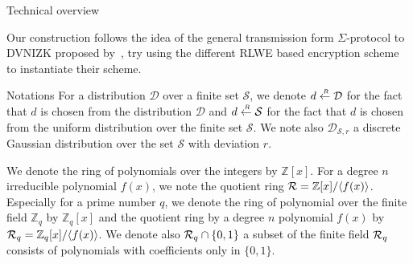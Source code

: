 \begin{subsection}{Technical overview}

  Our construction follows the idea of the general transmission form $\Sigma$-protocol to DVNIZK proposed by~\cite{DBLP:conf/pkc/ChaidosG15},
  try using the different RLWE based encryption scheme to instantiate their scheme.
  
\end{subsection}




\begin{subsection}{Notations}
  For a distribution $\mathcal{D}$ over a finite set $\mathcal{S}$,
  we denote $d \stackrel{{\scriptscriptstyle \mkern4mu R}}{\gets} \mathcal{D}$ for the fact that $d$ is chosen from the distribution $\mathcal{D}$ and
  $d \stackrel{{\scriptscriptstyle \mkern4mu R}}{\gets} \mathcal{S}$ for the fact that $d$ is chosen from the uniform distribution over the finite set $\mathcal{S}$.
  We note also $\mathcal{D}_{\mathcal{S}, r}$ a discrete Gaussian distribution over the set $\mathcal{S}$ with deviation $r$.

  We denote the ring of polynomials over the integers by $\mathbb{Z}[x]$.
  For a degree $n$ irreducible polynomial $f(x)$, we note the quotient ring ${\mathcal{R}} = \mathbb{Z}[x]/\langle f(x) \rangle$.
  Especially for a prime number $q$, we denote the ring of polynomial over the finite field $\mathbb{Z}_q$ by $\mathbb{Z}_q[x]$
  and the quotient ring by a degree $n$ polynomial $f(x)$ by ${\mathcal{R}}_q = \mathbb{Z}_q[x]/\langle f(x) \rangle$.
  We denote also ${\mathcal{R}}_q\cap \{0,1\}$ a subset of the finite field ${\mathcal{R}}_q$ consists of polynomials with coefficients only in $ \{0,1\}$.

  

\end{subsection}
